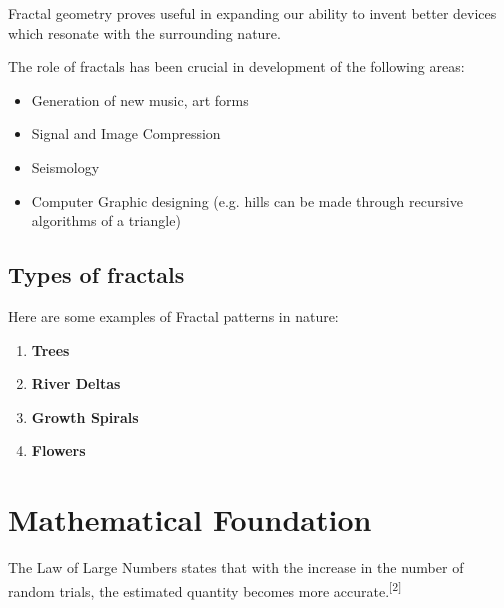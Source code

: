 \documentclass{resonance}
\begin{document}
Fractal geometry proves useful in expanding our ability to invent better devices which resonate with the surrounding nature.

The role of fractals has been crucial in development of the following areas:

\begin{itemize}
    \item Generation of new music, art forms   
    \item Signal and Image Compression    
    \item Seismology
    \item Computer Graphic designing (e.g. hills can be made through recursive algorithms of a triangle)
\end{itemize}

\subsection*{Types of fractals}

Here are some examples of Fractal patterns in nature:


\begin{enumerate}
    \item \textbf{Trees}
    \item \textbf{River Deltas}
    \item \textbf{Growth Spirals}
    \item \textbf{Flowers}
\end{enumerate}

\section*{Mathematical Foundation}
The Law of Large Numbers states that with the increase in the number of random trials, the estimated quantity becomes more accurate.\textsuperscript{[2]}
\end{document}
